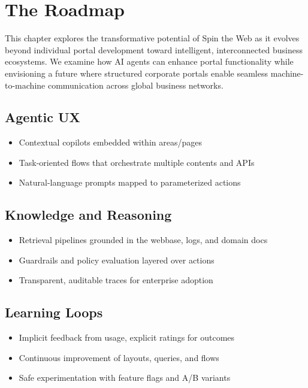 
\chapter{The Roadmap}
\label{chap:roadmap}

This chapter explores the transformative potential of Spin the Web as it evolves beyond individual portal development toward intelligent, interconnected business ecosystems. We examine how AI agents can enhance portal functionality while envisioning a future where structured corporate portals enable seamless machine-to-machine communication across global business networks.

\section{Agentic UX}
\begin{itemize}
	\item Contextual copilots embedded within areas/pages
	\item Task-oriented flows that orchestrate multiple contents and APIs
	\item Natural-language prompts mapped to parameterized actions
\end{itemize}

\section{Knowledge and Reasoning}
\begin{itemize}
	\item Retrieval pipelines grounded in the webbase, logs, and domain docs
	\item Guardrails and policy evaluation layered over actions
	\item Transparent, auditable traces for enterprise adoption
\end{itemize}

\section{Learning Loops}
\begin{itemize}
	\item Implicit feedback from usage, explicit ratings for outcomes
	\item Continuous improvement of layouts, queries, and flows
	\item Safe experimentation with feature flags and A/B variants
\end{itemize}

